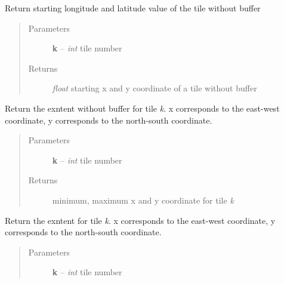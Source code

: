 \documentclass[letterpaper,10pt,english]{sphinxmanual}
\begin{document}
\begin{fulllineitems}
\begin{fulllineitems}
\end{fulllineitems}



\begin{fulllineitems}
\label{docs/all_multipliers:all_multipliers.TileGrid.get_startcord}
Return starting longitude and latitude value of the tile without buffer
\begin{quote}\begin{description}
\item[{Parameters}] \leavevmode
\textbf{k} -- \emph{int} tile number

\item[{Returns}] \leavevmode
\emph{float} starting x and y coordinate of a tile without buffer

\end{description}\end{quote}

\end{fulllineitems}



\begin{fulllineitems}
\label{docs/all_multipliers:all_multipliers.TileGrid.get_tile_extent}
Return the exntent without buffer for tile \emph{k}. x corresponds to the
east-west coordinate, y corresponds to the north-south
coordinate.
\begin{quote}\begin{description}
\item[{Parameters}] \leavevmode
\textbf{k} -- \emph{int} tile number

\item[{Returns}] \leavevmode
minimum, maximum x and y coordinate for tile \emph{k}

\end{description}\end{quote}

\end{fulllineitems}



\begin{fulllineitems}
\label{docs/all_multipliers:all_multipliers.TileGrid.get_tile_extent_buffer}
Return the exntent for tile \emph{k}. x corresponds to the
east-west coordinate, y corresponds to the north-south
coordinate.
\begin{quote}\begin{description}
\item[{Parameters}] \leavevmode
\textbf{k} -- \emph{int} tile number


\end{description}
\end{quote}
\end{fulllineitems}
\end{fulllineitems}
\end{document}
